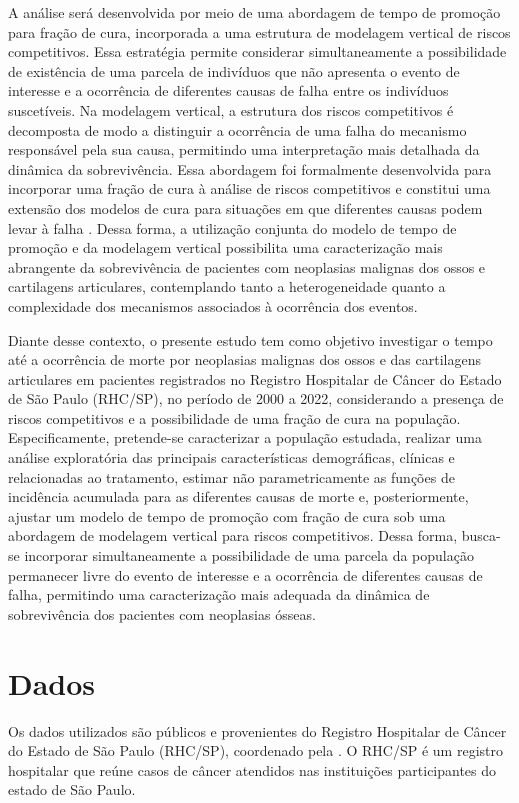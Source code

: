 \documentclass[11pt,a4paper]{article}
\begin{document}
A análise será desenvolvida por meio de uma abordagem de tempo de promoção para fração de cura, incorporada a uma estrutura de modelagem vertical de riscos competitivos. Essa estratégia permite considerar simultaneamente a possibilidade de existência de uma parcela de indivíduos que não apresenta o evento de interesse e a ocorrência de diferentes causas de falha entre os indivíduos suscetíveis. Na modelagem vertical, a estrutura dos riscos competitivos é decomposta de modo a distinguir a ocorrência de uma falha do mecanismo responsável pela sua causa, permitindo uma interpretação mais detalhada da dinâmica da sobrevivência. Essa abordagem foi formalmente desenvolvida para incorporar uma fração de cura à análise de riscos competitivos e constitui uma extensão dos modelos de cura para situações em que diferentes causas podem levar à falha \citep{Nicolaie2019}. Dessa forma, a utilização conjunta do modelo de tempo de promoção e da modelagem vertical possibilita uma caracterização mais abrangente da sobrevivência de pacientes com neoplasias malignas dos ossos e cartilagens articulares, contemplando tanto a heterogeneidade quanto a complexidade dos mecanismos associados à ocorrência dos eventos.

Diante desse contexto, o presente estudo tem como objetivo investigar o tempo até a ocorrência de morte por neoplasias malignas dos ossos e das cartilagens articulares em pacientes registrados no Registro Hospitalar de Câncer do Estado de São Paulo (RHC/SP), no período de 2000 a 2022, considerando a presença de riscos competitivos e a possibilidade de uma fração de cura na população. Especificamente, pretende-se caracterizar a população estudada, realizar uma análise exploratória das principais características demográficas, clínicas e relacionadas ao tratamento, estimar não parametricamente as funções de incidência acumulada para as diferentes causas de morte e, posteriormente, ajustar um modelo de tempo de promoção com fração de cura sob uma abordagem de modelagem vertical para riscos competitivos. Dessa forma, busca-se incorporar simultaneamente a possibilidade de uma parcela da população permanecer livre do evento de interesse e a ocorrência de diferentes causas de falha, permitindo uma caracterização mais adequada da dinâmica de sobrevivência dos pacientes com neoplasias ósseas.
\vspace{-0.1cm}
\section{Dados}
Os dados utilizados são públicos e provenientes do Registro Hospitalar de Câncer do Estado de São Paulo (RHC/SP), coordenado pela  \cite{FOSP2026}. O RHC/SP é um registro hospitalar que reúne casos de câncer atendidos nas instituições participantes do estado de São Paulo.
\end{document}
